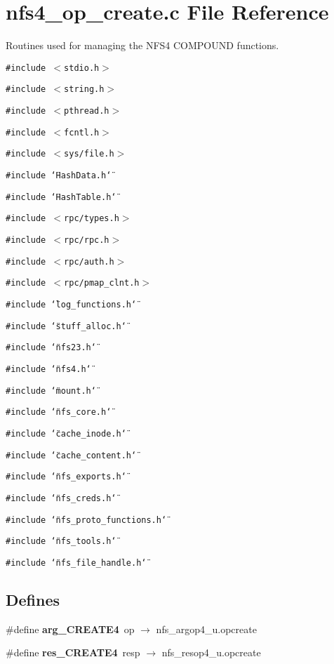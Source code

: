 \section{nfs4\_\-op\_\-create.c File Reference}
\label{nfs4__op__create_8c}
Routines used for managing the NFS4 COMPOUND functions. 

{\tt \#include $<$stdio.h$>$}\par
{\tt \#include $<$string.h$>$}\par
{\tt \#include $<$pthread.h$>$}\par
{\tt \#include $<$fcntl.h$>$}\par
{\tt \#include $<$sys/file.h$>$}\par
{\tt \#include \char`\"{}Hash\-Data.h\char`\"{}}\par
{\tt \#include \char`\"{}Hash\-Table.h\char`\"{}}\par
{\tt \#include $<$rpc/types.h$>$}\par
{\tt \#include $<$rpc/rpc.h$>$}\par
{\tt \#include $<$rpc/auth.h$>$}\par
{\tt \#include $<$rpc/pmap\_\-clnt.h$>$}\par
{\tt \#include \char`\"{}log\_\-functions.h\char`\"{}}\par
{\tt \#include \char`\"{}stuff\_\-alloc.h\char`\"{}}\par
{\tt \#include \char`\"{}nfs23.h\char`\"{}}\par
{\tt \#include \char`\"{}nfs4.h\char`\"{}}\par
{\tt \#include \char`\"{}mount.h\char`\"{}}\par
{\tt \#include \char`\"{}nfs\_\-core.h\char`\"{}}\par
{\tt \#include \char`\"{}cache\_\-inode.h\char`\"{}}\par
{\tt \#include \char`\"{}cache\_\-content.h\char`\"{}}\par
{\tt \#include \char`\"{}nfs\_\-exports.h\char`\"{}}\par
{\tt \#include \char`\"{}nfs\_\-creds.h\char`\"{}}\par
{\tt \#include \char`\"{}nfs\_\-proto\_\-functions.h\char`\"{}}\par
{\tt \#include \char`\"{}nfs\_\-tools.h\char`\"{}}\par
{\tt \#include \char`\"{}nfs\_\-file\_\-handle.h\char`\"{}}\par
\subsection*{Defines}
\begin{CompactItemize}
\item 
\#define {\bf arg\_\-CREATE4}\ op $\rightarrow$ nfs\_\-argop4\_\-u.opcreate
\item 
\#define {\bf res\_\-CREATE4}\ resp $\rightarrow$ nfs\_\-resop4\_\-u.opcreate
\end{CompactItemize}
